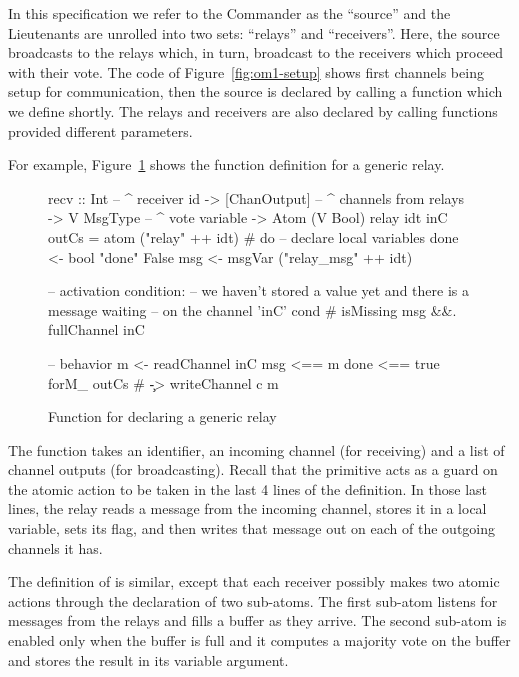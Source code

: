 In this specification we refer to the Commander as the ``source'' and the
Lieutenants are unrolled into two sets: ``relays'' and ``receivers''. Here,
the source broadcasts to the relays which, in turn, broadcast to the
receivers which proceed with their vote. The code of Figure~\ref{fig:om1-setup} shows first channels being setup for communication, then
the source is declared by calling a function which we define shortly. The
relays and receivers are also declared by calling functions provided different
parameters.

For example, Figure~\ref{fig:om1-relay} shows the function definition for a
generic relay.

\begin{figure}
\begin{lima}
recv :: Int           -- ^ receiver id
     -> [ChanOutput]  -- ^ channels from relays
     -> V MsgType     -- ^ vote variable
     -> Atom (V Bool)
relay idt inC outCs = atom ("relay" ++ idt) # do
  -- declare local variables
  done <- bool "done" False
  msg  <- msgVar ("relay_msg" ++ idt)

  -- activation condition:
  --   we haven't stored a value yet and there is a message waiting
  --   on the channel 'inC'
  cond # isMissing msg &&. fullChannel inC

  -- behavior
  m <- readChannel inC
  msg  <== m
  done <== true
  forM_ outCs # \c -> writeChannel c m
\end{lima}
\caption{Function for declaring a generic relay}
\label{fig:om1-relay}
\end{figure}

The  function takes an identifier, an incoming channel (for
receiving) and a list of channel outputs (for broadcasting). Recall that the
 primitive acts as a guard on the atomic action to be taken in the
last 4 lines of the definition. In those last lines, the relay reads a message
from the incoming channel, stores it in a local variable, sets its 
flag, and then writes that message out on each of the outgoing channels it has.

The definition of  is similar, except that each receiver possibly makes two
atomic actions through the declaration of two sub-atoms. The first sub-atom
listens for messages from the relays and fills a buffer as they arrive. The
second sub-atom is enabled only when the buffer is full and it computes a
majority vote on the buffer and stores the result in its  variable
argument.

